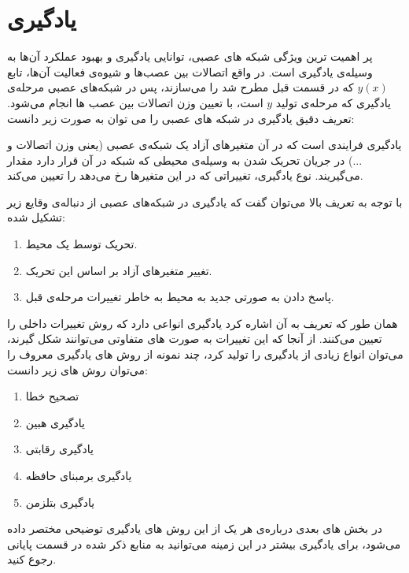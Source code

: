 \documentclass[11pt,a4paper,twocolumn]{article}
\begin{document}
\section{یادگیری}
پر اهمیت ترین ویژگی شبکه های عصبی، توانایی یادگیری و بهبود عملکرد آن‌ها به وسیله‌ی یادگیری است. در واقع اتصالات بین عصب‌ها و شیوه‌ی فعالیت آن‌ها، تابع $y(x)$  که در قسمت قبل مطرح شد را می‌سازند، پس در شبکه‌های عصبی مرحله‌ی یادگیری که مرحله‌ی تولید $y$ است، با تعیین وزن اتصالات بین عصب ها انجام می‌شود. تعریف دقیق یادگیری در شبکه های عصبی را می توان به صورت زیر دانست:

یادگیری فرایندی است که در آن متغیر‌های آزاد یک شبکه‌ی عصبی (یعنی وزن اتصالات و ...) در جریان تحریک شدن به وسیله‌ی محیطی که شبکه در آن قرار دارد مقدار می‌گیریند. نوع یادگیری، تغییراتی که در این متغیر‌ها رخ می‌دهد را تعیین می‌کند.\cite[ص-۵۰]{haykin}

با توجه به تعریف بالا می‌توان گفت که یادگیری در شبکه‌های عصبی از دنباله‌ی وقایع زیر تشکیل شده:

\begin{enumerate}
\item
تحریک توسط یک محیط.
\item
تغییر متغیر‌های آزاد بر اساس این تحریک.
\item
پاسخ دادن به صورتی جدید به محیط به خاطر تغییرات مرحله‌ی قبل.
\end{enumerate}

همان طور که تعریف به آن اشاره کرد یادگیری انواعی دارد که روش تغییرات داخلی را تعیین می‌کنند. از آنجا که این تغییرات به صورت های متفاوتی می‌توانند شکل گیرند، می‌توان انواع زیادی از یادگیری را تولید کرد، چند نمونه از روش های یادگیری معروف را می‌توان روش های زیر دانست:

\begin{enumerate}
\item
تصحیح خطا
\item
یادگیری هبین
\item
یادگیری رقابتی
\item
یادگیری برمبنای حافظه
\item
یادگیری بتلزمن
\end{enumerate}
در بخش های بعدی درباره‌ی هر یک از این روش های یادگیری توضیحی مختصر داده می‌شود، برای یادگیری بیشتر در این زمینه می‌توانید به منابع ذکر شده در قسمت پایانی رجوع کنید.
\end{document}
